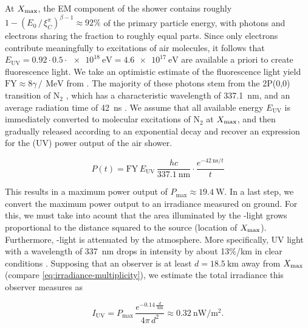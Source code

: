 At $X_\mathrm{max}$, the EM component of the shower contains roughly
$1-\left(E_0\,/\,\xi^\pi_C\right)^{\beta-1}\approx92\%$ of the primary particle 
energy, with photons and electrons sharing the fraction to roughly equal parts.
Since only electrons contribute meaningfully to excitations of air molecules, it 
follows that $E_\text{UV}=0.92\cdot0.5\cdot\SI{e18}{\electronvolt}=
\SI{4.6e17}{\electronvolt}$ are available a priori to create fluorescence light.
We take an optimistic estimate of the fluorescence light yield 
$\text{FY}\approx8\gamma\,/\,\SI{}{\mega\electronvolt}$ from 
\cite{keilhauerNitrogenFluorescenceAir2013}. The majority of these photons stem 
from the 2P(0,0) transition of N$_2$ \cite{aveSpectrallyResolvedPressure2008}, 
which has a characteristic wavelength of \SI{337.1}{\nano\meter}, and an average 
radiation time of \SI{42}{\nano\second} 
\cite{leanContributionUltravioletIrradiance1989}. We assume that all available 
energy $E_\text{UV}$ is immediately converted to molecular excitations of N$_2$ 
at $X_\mathrm{max}$, and then gradually released according to an exponential decay and 
recover an expression for the (UV) power output of the air shower.

\begin{equation}
\label{eq:irradiance-power}
P(t)= \text{FY}\,E_\text{UV}\,\frac{hc}{\SI{337.1}{\nano\meter}} \cdot\frac{e^{-\SI{42}{\nano\second}/t}}{t}   
\end{equation}

This results in a maximum power output of $P_\text{max}\approx\SI{19.4}{\watt}$. 
In a last step, we convert the maximum power output to an irradiance measured on
ground. For this, we must take into acount that the area illuminated by the 
\UV-light grows proportional to the distance squared to the source (location of 
$X_\mathrm{max}$). Furthermore, \UV-light is attenuated by the atmosphere. More 
specifically, UV light with a wavelength of \SI{337}{\nano\meter} drops in 
intensity by about 13\%/km in clear conditions 
\cite[see Fig. 83 on page 103 of][]{baumAttenuationUltravioletLight2008}. Supposing that 
an observer is at least $d=\SI{18.5}{\kilo\meter}$ away from $X_\mathrm{max}$ (compare 
\cref{eq:irradiance-multiplicity}), we estimate the total irradiance this observer 
measures as

\begin{equation}
\label{eq:irradiance}
I_\text{UV} = P_\text{max}\,\frac{e^{-0.14\,\frac{d}{\SI{}{\kilo\meter}}}}{4\pi\,d^2}\approx\SI{0.32}{\nano\watt\per\square\meter}.
\end{equation}
